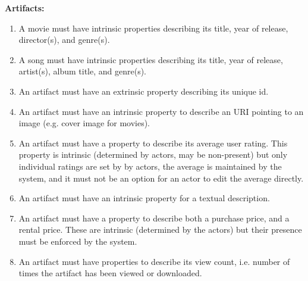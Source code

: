 \textbf{Artifacts:}
\begin{enumerate}
\item A movie must have intrinsic properties describing its title, year of
	release, director(s), and genre(s).
\item A song must have intrinsic properties describing its title, year of
	release, artist(s), album title, and genre(s).
\item An artifact must have an extrinsic property describing its unique id.
\item An artifact must have an intrinsic property to describe an URI pointing to
	an image (e.g. cover image for movies).
\item An artifact must have a property to describe its average
	user rating. This property is intrinsic (determined by actors, may be
	non-present) but only individual ratings are set by by actors, the
	average is maintained by the system, and it must not be an option for an
	actor to edit the average directly.
\item An artifact must have an intrinsic property for a textual description.
\item An artifact must have a property to describe both a purchase price, and a
	rental price. These are intrinsic (determined by the actors) but their
	presence must be enforced by the system. \label{itm:priceReq}
\item An artifact must have properties to describe its view count, i.e. number
	of times the artifact has been viewed or downloaded.
\setcounter{enumTemp}{\theenumi}
\end{enumerate}

